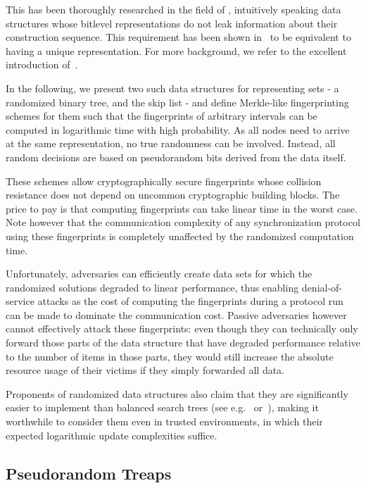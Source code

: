 This has been thoroughly researched in the field of , intuitively speaking data structures whose bitlevel representations do not leak information about their construction sequence. This requirement has been shown in~\cite{hartline2005characterizing} to be equivalent to having a unique representation. For more background, we refer to the excellent introduction of~\cite{bender2016anti}.

In the following, we present two such data structures for representing sets - a randomized binary tree, and the skip list - and define Merkle-like fingerprinting schemes for them such that the fingerprints of arbitrary intervals can be computed in logarithmic time with high probability. As all nodes need to arrive at the same representation, no true randomness can be involved. Instead, all random decisions are based on pseudorandom bits derived from the data itself.

These schemes allow cryptographically secure fingerprints whose collision resistance does not depend on uncommon cryptographic building blocks. The price to pay is that computing fingerprints can take linear time in the worst case. Note however that the communication complexity of any synchronization protocol using these fingerprints is completely unaffected by the randomized computation time.

Unfortunately, adversaries can efficiently create data sets for which the randomized solutions degraded to linear performance, thus enabling denial-of-service attacks as the cost of computing the fingerprints during a protocol run can be made to dominate the communication cost. Passive adversaries however cannot effectively attack these fingerprints: even though they can technically only forward those parts of the data structure that have degraded performance relative to the number of items in those parts, they would still increase the absolute resource usage of their victims if they simply forwarded all data.

Proponents of randomized data structures also claim that they are significantly easier to implement than balanced search trees (see e.g.~\cite{seidel1996randomized} or~\cite{pugh1990skip}), making it worthwhile to consider them even in trusted environments, in which their expected logarithmic update complexities suffice.

\subsection{Pseudorandom Treaps}


